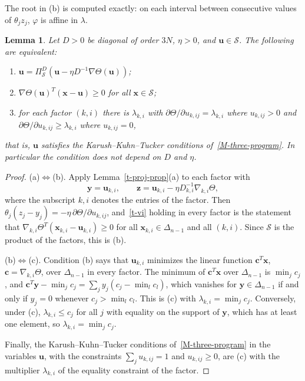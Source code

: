 \documentclass[11pt]{article}
\theoremstyle{plain}
\newtheorem{lemma}[theorem]{Lemma}
\theoremstyle{remark}
\numberwithin{equation}{section}
\begin{document}
The root in (b) is computed exactly: on each interval between consecutive
values of $\theta_jz_j$, $\varphi$ is affine in $\lambda$.

\begin{lemma}\label{t-fixed}
Let $D>0$ be diagonal of order $3N$, $\eta>0$, and
$\bm u\in\mathcal{S}$. The following are equivalent:
\begin{enumerate}
\renewcommand{\labelenumi}{(\alph{enumi})}
\item $\bm u=\Pi^D_{\mathcal{S}}\left(\bm u-\eta D^{-1}\nabla\Theta\left(\bm u\right)\right)$;
\item $\nabla\Theta\left(\bm u\right)^T\left(\bm x-\bm u\right)\ge 0$ for all $\bm x\in\mathcal{S}$;
\item for each factor $(k,i)$ there is $\lambda_{k,i}$ with
$\partial\Theta/\partial u_{k,ij}=\lambda_{k,i}$ where $u_{k,ij}>0$
and $\partial\Theta/\partial u_{k,ij}\ge\lambda_{k,i}$ where $u_{k,ij}=0$,
\end{enumerate}
that is, $\bm u$ satisfies the Karush--Kuhn--Tucker conditions
of~\eqref{M-three-program}. In particular the condition does not depend on $D$
and $\eta$.
\end{lemma}
\begin{proof}
(a)$\Leftrightarrow$(b). Apply Lemma~\ref{t-proj-prop}(a) to each factor
with
\begin{equation*}
\bm y=\bm u_{k,i},\qquad
\bm z=\bm u_{k,i}-\eta D_{k,i}^{-1}\nabla_{k,i}\Theta,
\end{equation*}
where the subscript $k,i$ denotes the entries of the factor. Then
$\theta_j(z_j-y_j)=-\eta\,\partial\Theta/\partial u_{k,ij}$,
and~\eqref{t-vi} holding in every factor is the statement that
$\nabla_{k,i}\Theta^T(\bm x_{k,i}-\bm u_{k,i})\ge 0$ for all
$\bm x_{k,i}\in\Delta_{n-1}$ and all $(k,i)$. Since $\mathcal{S}$ is the
product of the factors, this is (b).

(b)$\Leftrightarrow$(c). Condition (b) says that $\bm u_{k,i}$
minimizes the linear function $\bm c^T\bm x$, $\bm c=\nabla_{k,i}\Theta$, over
$\Delta_{n-1}$ in every factor. The minimum of $\bm c^T\bm x$ over
$\Delta_{n-1}$ is $\min_jc_j$, and
$\bm c^T\bm y-\min_jc_j=\sum_jy_j\left(c_j-\min_lc_l\right)$, which vanishes for
$\bm y\in\Delta_{n-1}$ if and only if $y_j=0$ whenever $c_j>\min_lc_l$. This
is (c) with $\lambda_{k,i}=\min_jc_j$. Conversely, under (c),
$\lambda_{k,i}\le c_j$ for all $j$ with equality on the support of $\bm y$,
which has at least one element, so $\lambda_{k,i}=\min_jc_j$.

Finally, the Karush--Kuhn--Tucker conditions of~\eqref{M-three-program} in the
variables $\bm u$, with the constraints $\sum_ju_{k,ij}=1$
and $u_{k,ij}\ge 0$, are (c) with the multiplier $\lambda_{k,i}$ of
the equality constraint of the factor.
\end{proof}
\end{document}

